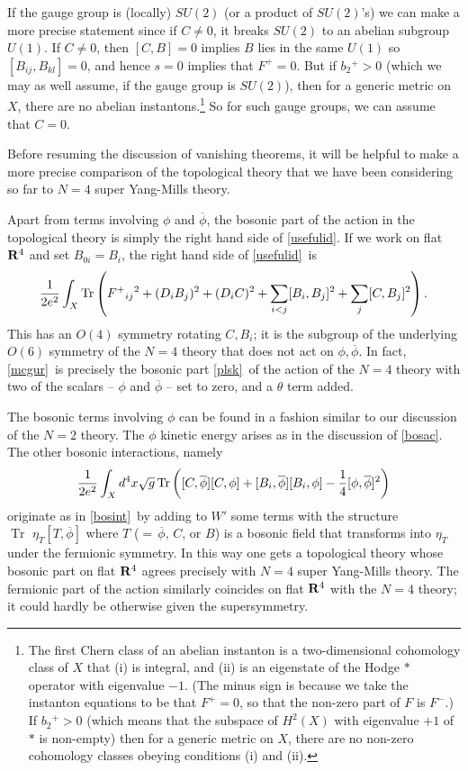 \documentclass[12pt]{article}
\numberwithin{equation}{section}
\def\bar{\overline}
\DeclareMathOperator{\Tr}{Tr}
\begin{document}
If the gauge group is (locally) $SU(2)$ (or a product of $SU(2)$'s)
we can make a more precise
statement since if $C\not= 0$, it breaks $SU(2)$ to an abelian subgroup
$U(1)$.  If $C\not= 0$, then $[C,B]=0$ implies $B$ lies in the same $U(1)$
so $[B_{ij},B_{kl}]=0$, and hence
$s=0$ implies that $F^+=0$.  But if $b_2{}^+>0$ (which we may as well
assume, if the gauge group is $SU(2)$), then for a generic metric on
$X$, there are no abelian instantons.\footnote{The first Chern class
  of an abelian instanton is a two-dimensional cohomology class of $X$
  that (i) is integral, and (ii) is an eigenstate of the Hodge $*$
  operator with eigenvalue $-1$.  (The minus sign is because we take
    the instanton equations to be that $F^+=0$, so that the non-zero part
  of $F$ is $F^-$.) If $b_2{}^+>0$ (which means that the subspace of
  $H^2(X)$ with eigenvalue $+1$ of $*$ is non-empty) then for a generic
  metric on $X$, there are no non-zero cohomology classes obeying
conditions (i) and (ii).}
So for such gauge groups,
we can assume that $C=0$.

\bigskip
{}

Before resuming the discussion of vanishing theorems,
it will be helpful to make a more precise comparison of the
topological theory that we have been considering so far to
$N=4$ super Yang-Mills theory.

Apart from terms involving $\phi$ and $\bar\phi$, the bosonic
part of the action in the topological theory
is simply the right hand side of
\eqref{usefulid}.  If we work on flat ${\bf R}^4$ and set $B_{0i}=B_i$,
the right hand side of \eqref{usefulid}\ is
\begin{equation}
  \label{mcgur}
  {1\over 2e^2}\int_X\Tr\left(F^+{}_{ij}{}^2+ (D_iB_{j})^2+(D_iC)^2
  +\sum_{i<j}[B_{i},B_{j}]^2+\sum_j[C,B_{j}]^2\right).
\end{equation}
This has an $O(4)$ symmetry rotating $C,B_i$; it is the subgroup of
the underlying $O(6)$ symmetry of the $N=4$ theory that does not
act on $\phi,\bar\phi$.  In fact, \eqref{mcgur}\ is precisely the bosonic
part \eqref{plsk}\
of the action of the $N=4$ theory with two of the scalars
-- $\phi$ and $\bar \phi$ -- set to zero, and a $\theta$ term added.

The bosonic terms involving $\phi$ can be found in a fashion similar
to our discussion of the $N=2$ theory. The $\phi$ kinetic energy
arises as in the discussion of \eqref{bosac}.  The other bosonic interactions,
namely
\begin{equation}
  \label{huj}
  {1\over 2e^2}\int_Xd^4x\sqrt g\Tr\left([C,\bar\phi][C,\phi]
  +[B_i,\bar\phi][B_i,\phi]-{1\over 4}[\phi,\bar\phi]^2\right)
\end{equation}
originate as in \eqref{bosint}\ by adding to $W'$ some terms with
the structure $\Tr\,\,\eta_T[T,\bar\phi]$ where $T$ ($=\,\bar\phi,\,
C$, or $B$)
is a bosonic field that transforms into $\eta_T$ under the fermionic symmetry.
In this way one gets a topological theory whose bosonic part
on flat ${\bf R}^4$ agrees precisely with $N=4$
super Yang-Mills theory.  The fermionic part of the action similarly
coincides on flat ${\bf R}^4$ with the $N=4$ theory; it could hardly
be otherwise given the supersymmetry.
\end{document}
